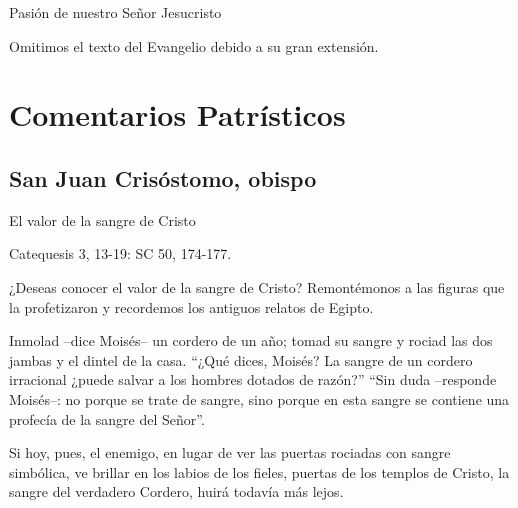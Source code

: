 			
			
			\begin{readtheme}Pasión de nuestro Señor Jesucristo\end{readtheme}
			
			
			
			\begin{rubrica}Omitimos el texto del Evangelio debido a su gran extensión.\end{rubrica}
			
			
			
			\section{Comentarios Patrísticos}
			
			
			
			
			
			\subsection{San Juan Crisóstomo, obispo}
			
			
			
			\begin{patertheme}El valor de la sangre de Cristo\end{patertheme}
			
			\begin{patersource}Catequesis 3, 13-19: SC 50, 174-177.\end{patersource}
			
			\begin{body}¿Deseas conocer el valor de la sangre de Cristo? Remontémonos a las figuras que la profetizaron y recordemos los antiguos relatos de Egipto.\end{body}
			
			\begin{body}Inmolad –dice Moisés– un cordero de un año; tomad su sangre y rociad las dos jambas y el dintel de la casa. “¿Qué dices, Moisés? La sangre de un cordero irracional ¿puede salvar a los hombres dotados de razón?” “Sin duda –responde Moisés–: no porque se trate de sangre, sino porque en esta sangre se contiene una profecía de la sangre del Señor”.\end{body}
			
			\begin{body}Si hoy, pues, el enemigo, en lugar de ver las puertas rociadas con sangre simbólica, ve brillar en los labios de los fieles, puertas de los templos de Cristo, la sangre del verdadero Cordero, huirá todavía más lejos.\end{body}
			
